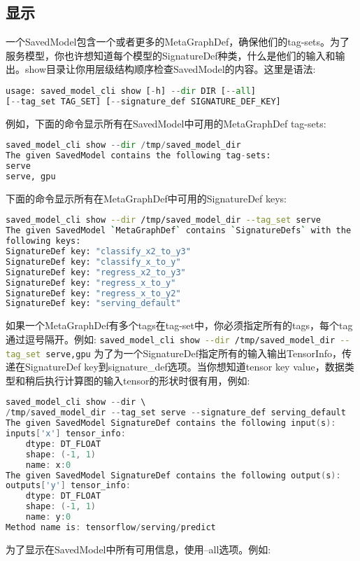 \subsection{显示}
一个SavedModel包含一个或者更多的MetaGraphDef，确保他们的tag-sets。为了服务模型，你也许想知道每个模型的SignatureDef种类，什么是他们的输入和输出。show目录让你用层级结构顺序检查SavedModel的内容。这里是语法:
\begin{lstlisting}[language=Python]
usage: saved_model_cli show [-h] --dir DIR [--all]
[--tag_set TAG_SET] [--signature_def SIGNATURE_DEF_KEY]
\end{lstlisting}
例如，下面的命令显示所有在SavedModel中可用的MetaGraphDef tag-sets:
\begin{lstlisting}[language=Python]
saved_model_cli show --dir /tmp/saved_model_dir
The given SavedModel contains the following tag-sets:
serve
serve, gpu 
\end{lstlisting}
下面的命令显示所有在MetaGraphDef中可用的SignatureDef keys:
\begin{lstlisting}[language=Bash]
saved_model_cli show --dir /tmp/saved_model_dir --tag_set serve
The given SavedModel `MetaGraphDef` contains `SignatureDefs` with the
following keys:
SignatureDef key: "classify_x2_to_y3"
SignatureDef key: "classify_x_to_y"
SignatureDef key: "regress_x2_to_y3"
SignatureDef key: "regress_x_to_y"
SignatureDef key: "regress_x_to_y2"
SignatureDef key: "serving_default"
\end{lstlisting}
如果一个MetaGraphDef有多个tags在tag-set中，你必须指定所有的tags，每个tag通过逗号隔开。例如:
\lstinline[language=Bash]{saved_model_cli show --dir /tmp/saved_model_dir --tag_set serve,gpu}
为了为一个SignatureDef指定所有的输入输出TensorInfo，传递在SignatureDef key到signature\_def选项。当你想知道tensor key value，数据类型和稍后执行计算图的输入tensor的形状时很有用，例如:
\begin{lstlisting}[language=C++]
saved_model_cli show --dir \
/tmp/saved_model_dir --tag_set serve --signature_def serving_default
The given SavedModel SignatureDef contains the following input(s):
inputs['x'] tensor_info:
    dtype: DT_FLOAT
    shape: (-1, 1)
    name: x:0
The given SavedModel SignatureDef contains the following output(s):
outputs['y'] tensor_info:
    dtype: DT_FLOAT
    shape: (-1, 1)
    name: y:0
Method name is: tensorflow/serving/predict
\end{lstlisting}
为了显示在SavedModel中所有可用信息，使用--all选项。例如:
